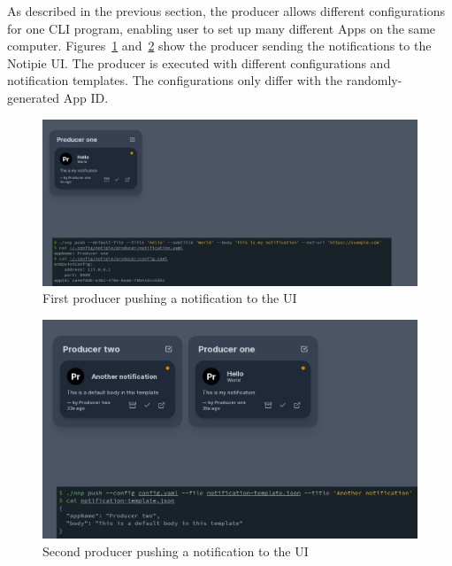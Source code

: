 As described in the previous section,
the producer allows different configurations
for one \ac{CLI} program,
enabling user to set up many different Apps
on the same computer.
Figures~\ref{fig:notipie-one-notification}
and~\ref{fig:notipie-two-notifications}
show the producer sending the notifications
to the Notipie \ac{UI}.
The producer is executed
with different configurations
and notification templates.
The configurations only differ
with the randomly-generated App \ac{ID}.

\begin{figure}[p]
  \centering
  \includegraphics[width=\linewidth,keepaspectratio]{img/notipie_one_notification.jpg}
  \caption{First producer pushing a notification to the UI}
  \label{fig:notipie-one-notification}
\end{figure}

\begin{figure}[p]
  \centering
  \includegraphics[width=\linewidth,keepaspectratio]{img/notipie_two_notifications.jpg}
  \caption{Second producer pushing a notification to the UI}
  \label{fig:notipie-two-notifications}
\end{figure}
